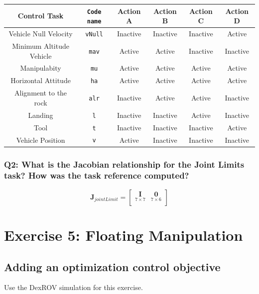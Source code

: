 \documentclass{article}
\begin{document}
\begin{center}
\begin{tabular}{ | c | c | c | c | c | c |}
\hline
 Control Task & \texttt{Code name} & Action A & Action B & Action C & Action D\\
 \hline
 Vehicle Null Velocity & \texttt{vNull} & Inactive & Inactive & Inactive & Active\\
 Minimum Altitude Vehicle &  \texttt{mav} & Active & Active & Inactive & Inactive \\  
 Manipulabity &  \texttt{mu} & Active & Active & Active & Active  \\
 Horizontal Attitude &  \texttt{ha} & Active & Active & Active & Active\\
 Alignment to the rock & \texttt{alr} & Inactive & Active & Active & Inactive \\
 Landing & \texttt{l} &Inactive & Inactive & Active & Inactive\\
 Tool  &  \texttt{t} & Inactive & Inactive & Inactive & Active\\
 Vehicle Position &  \texttt{v} &Active & Inactive & Inactive & Inactive\\
 \hline
\end{tabular}
\end{center}

\subsubsection{Q2: What is the Jacobian relationship for the Joint Limits task? How was the task reference computed?}

\begin{equation}
\boldsymbol{J}_{jointLimit}=
    \begin{bmatrix}
     \underset{7\times 7}{\boldsymbol{I}} & \underset{7\times6}{\boldsymbol{0}} \\
    \end{bmatrix}
\end{equation}

\clearpage
\section{Exercise 5: Floating Manipulation}
\subsection{Adding an optimization control objective}
Use the DexROV simulation for this exercise. 
\end{document}
